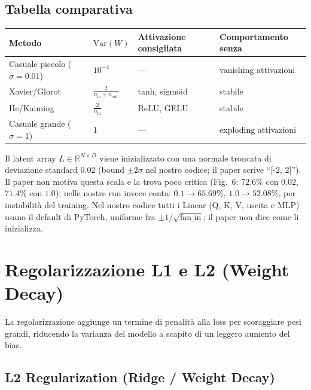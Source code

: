 \documentclass[
  11pt,
]{article}
\begin{document}
\subsection{Tabella comparativa}

\begin{center}
\begin{tabular}{llll}
\toprule
\textbf{Metodo} & \textbf{$\text{Var}(W)$} & \textbf{Attivazione consigliata} & \textbf{Comportamento senza} \\
\midrule
Casuale piccolo ($\sigma=0.01$) & $10^{-4}$ & --- & vanishing attivazioni \\
Xavier/Glorot & $\tfrac{2}{n_{\text{in}}+n_{\text{out}}}$ & tanh, sigmoid & stabile \\
He/Kaiming & $\tfrac{2}{n_{\text{in}}}$ & ReLU, GELU & stabile \\
Casuale grande ($\sigma=1$) & $1$ & --- & exploding attivazioni \\
\bottomrule
\end{tabular}
\end{center}

\begin{notabox}[title={\textbf{Collegamento al Perceiver}}]
Il latent array $L \in \mathbb{R}^{N \times D}$ viene inizializzato con una normale troncata di deviazione standard $0.02$ (bound $\pm 2\sigma$ nel nostro codice; il paper scrive ``[-2, 2]''). Il paper non motiva questa scala e la trova poco critica (Fig.~6: $72.6\%$ con $0.02$, $71.4\%$ con $1.0$); nelle nostre run invece conta: $0.1 \to 65.69\%$, $1.0 \to 52.08\%$, per instabilità del training. Nel nostro codice tutti i Linear (Q, K, V, uscita e MLP) usano il default di PyTorch, uniforme fra $\pm 1/\sqrt{\text{fan\_in}}$; il paper non dice come li inizializza.
\end{notabox}

\section{Regolarizzazione L1 e L2 (Weight Decay)}
\label{app:regularization}

La regolarizzazione aggiunge un termine di penalità alla loss per scoraggiare pesi grandi, riducendo la varianza del modello a scapito di un leggero aumento del bias.

\subsection{L2 Regularization (Ridge / Weight Decay)}
\end{document}
